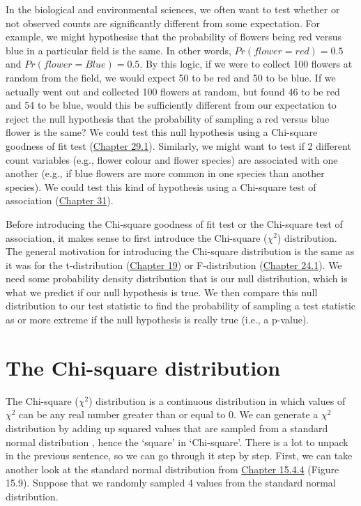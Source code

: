 \documentclass[
  openany]{krantz}
\begin{document}
In the biological and environmental sciences, we often want to test whether or not observed counts are significantly different from some expectation.
For example, we might hypothesise that the probability of flowers being red versus blue in a particular field is the same.
In other words, \(Pr(flower = red) = 0.5\) and \(Pr(flower = Blue) = 0.5\).
By this logic, if we were to collect 100 flowers at random from the field, we would expect 50 to be red and 50 to be blue.
If we actually went out and collected 100 flowers at random, but found 46 to be red and 54 to be blue, would this be sufficiently different from our expectation to reject the null hypothesis that the probability of sampling a red versus blue flower is the same?
We could test this null hypothesis using a Chi-square goodness of fit test (\protect\hyperlink{the-chi-square-distribution}{Chapter 29.1}).
Similarly, we might want to test if 2 different count variables (e.g., flower colour and flower species) are associated with one another (e.g., if blue flowers are more common in one species than another species).
We could test this kind of hypothesis using a Chi-square test of association (\protect\hyperlink{Chapter_31}{Chapter 31}).

Before introducing the Chi-square goodness of fit test or the Chi-square test of association, it makes sense to first introduce the Chi-square (\(\chi^{2}\)) distribution.
The general motivation for introducing the Chi-square distribution is the same as it was for the t-distribution (\protect\hyperlink{Chapter_19}{Chapter 19}) or F-distribution (\protect\hyperlink{the-f-distribution}{Chapter 24.1}).
We need some probability density distribution that is our null distribution, which is what we predict if our null hypothesis is true.
We then compare this null distribution to our test statistic to find the probability of sampling a test statistic as or more extreme if the null hypothesis is really true (i.e., a p-value).

\hypertarget{the-chi-square-distribution}{%
\section{The Chi-square distribution}\label{the-chi-square-distribution}}

The Chi-square (\(\chi^{2}\)) distribution is a continuous distribution in which values of \(\chi^{2}\) can be any real number greater than or equal to 0. We can generate a \(\chi^{2}\) distribution by adding up squared values that are sampled from a standard normal distribution \citep{Sokal1995}, hence the `square' in `Chi-square'.
There is a lot to unpack in the previous sentence, so we can go through it step by step.
First, we can take another look at the standard normal distribution from \protect\hyperlink{normal-distribution}{Chapter 15.4.4} (Figure 15.9).
Suppose that we randomly sampled 4 values from the standard normal distribution.
\end{document}
